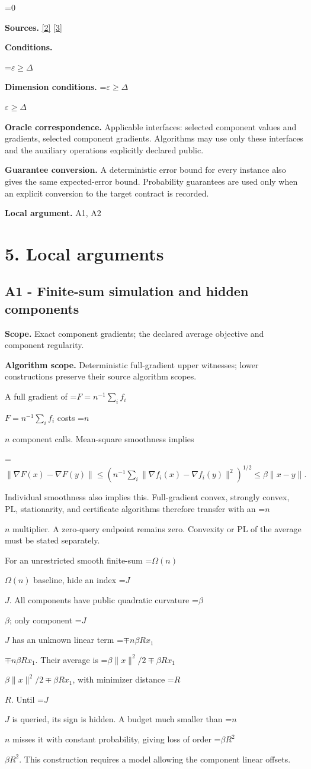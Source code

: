 \documentclass[10pt,a4paper]{article}
\newcommand{\AtlasMath}[1]{\par\begingroup\centering\setbox0=\hbox{$\displaystyle #1$}\ifdim\wd0>1.4\linewidth\typeout{ATLAS WIDE FORMULA: \the\wd0}\fi\ifdim\wd0>\linewidth\resizebox{\linewidth}{!}{\box0}\else\box0\fi\par\endgroup}
\newcommand{\AtlasInlineMath}[1]{\begingroup\setbox0=\hbox{$#1$}\ifdim\wd0>.4\linewidth\endgroup\AtlasMath{#1}\else\endgroup$#1$\fi}
\begin{document}
\AtlasMath{0}
\textbf{Sources.} \href{https://proceedings.mlr.press/v97/zhou19b/zhou19b.pdf}{[2]} \href{https://arxiv.org/pdf/1405.4980}{[3]}

\textbf{Conditions.} 
\AtlasMath{\varepsilon\ge\Delta}


\textbf{Dimension conditions.} \AtlasInlineMath{\varepsilon\ge\Delta}

\textbf{Oracle correspondence.} Applicable interfaces: selected component values and gradients, selected component gradients. Algorithms may use only these interfaces and the auxiliary operations explicitly declared public.

\textbf{Guarantee conversion.} A deterministic error bound for every instance also gives the same expected-error bound. Probability guarantees are used only when an explicit conversion to the target contract is recorded.

\textbf{Local argument.} A1, A2

\section{5. Local arguments}
\subsection{A1 - Finite-sum simulation and hidden components}
\textbf{Scope.} Exact component gradients; the declared average objective and component regularity.

\textbf{Algorithm scope.} Deterministic full-gradient upper witnesses; lower constructions preserve their source algorithm scopes.

A full gradient of \AtlasInlineMath{F=n^{-1}\sum_i f_i} costs \AtlasInlineMath{n} component calls. Mean-square smoothness implies

\AtlasMath{\|\nabla F(x)-\nabla F(y)\|
\le(n^{-1}\sum_i\|\nabla f_i(x)-\nabla f_i(y)\|^2)^{1/2}
\le\beta\|x-y\|.}

Individual smoothness also implies this. Full-gradient convex, strongly convex, PL, stationarity, and certificate algorithms therefore transfer with an \AtlasInlineMath{n} multiplier. A zero-query endpoint remains zero. Convexity or PL of the average must be stated separately.

For an unrestricted smooth finite-sum \AtlasInlineMath{\Omega(n)} baseline, hide an index \AtlasInlineMath{J}. All components have public quadratic curvature \AtlasInlineMath{\beta}; only component \AtlasInlineMath{J} has an unknown linear term \AtlasInlineMath{\mp n\beta R x_1}. Their average is
\AtlasInlineMath{\beta\|x\|^2/2\mp\beta Rx_1}, with minimizer distance \AtlasInlineMath{R}. Until \AtlasInlineMath{J} is queried, its sign is hidden. A budget much smaller than \AtlasInlineMath{n} misses it with constant probability, giving loss of order \AtlasInlineMath{\beta R^2}. This construction requires a model allowing the component linear offsets.
\end{document}
